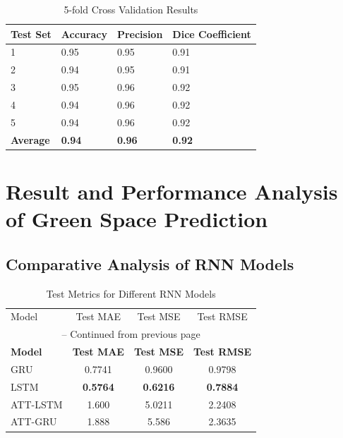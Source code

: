 \begin{table}[!h]
    \centering
    \caption{5-fold Cross Validation Results}
    \begin{tabular}{l p{2cm} p{2cm} p{3cm}}
        \hline
        Test Set & Accuracy & Precision & Dice Coefficient \\
        \hline
        1 & 0.95 & 0.95 & 0.91  \\
        2 & 0.94& 0.95 & 0.91 \\ 
        3 & 0.95& 0.96& 0.92\\ 
        4 & 0.94& 0.96& 0.92\\ 
        5 & 0.94& 0.96& 0.92\\ 
        \textbf{Average} & \textbf{0.94} & \textbf{0.96} & \textbf{0.92} \\
        \hline
    \end{tabular}
    \label{table6}
\end{table}


\section{Result and Performance Analysis of Green Space Prediction}


\subsection{Comparative Analysis of RNN Models}


\begin{longtable}{@{}lccc@{}}
\label{RNN_model}
    \caption{Test Metrics for Different RNN Models} \\
    \hline
    Model & Test MAE & Test MSE & Test RMSE \\
    \hline
    \endfirsthead
    
    \multicolumn{4}{c}{{\tablename} \thetable{} -- Continued from previous page} \\
    \hline
    \textbf{Model} & \textbf{Test MAE} & \textbf{Test MSE} & \textbf{Test RMSE} \\
    \hline
    \endhead
    
    GRU & 0.7741 & 0.9600 & 0.9798 \\
    LSTM & \textbf{0.5764} & \textbf{0.6216} & \textbf{0.7884} \\
    ATT-LSTM & 1.600 & 5.0211 & 2.2408 \\
    ATT-GRU & 1.888 & 5.586 & 2.3635 \\
    \hline
\end{longtable}

